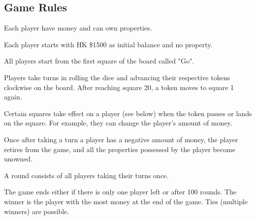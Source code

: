     \subsection{Game Rules}
      \label{sec:game-rules}
        \begin{enumerate}[label=\texttt{[GAME-RULES-\arabic*]}:, leftmargin=10em]
          \item Each player have money and can own properties.
          \item Each player starts with HK \$1500 as initial balance and no property.
          \item All players start from the first square of the board called "Go".
          \item Players take turns in rolling the dice and advancing their respective tokens clockwise on the board. After reaching square 20, a token moves to square 1 again.
          \item Certain squares take effect on a player (see below) when the token passes or lands on the square. For example, they can change the player's amount of money.
          \item Once after taking a turn a player has a negative amount of money, the player retires from the game, and all the properties possessed by the player become unowned.
          \item A round consists of all players taking their turns once.
          \item The game ends either if there is only one player left or after 100 rounds. The winner is the player with the most money at the end of the game. Ties (multiple winners) are possible.
        \end{enumerate}